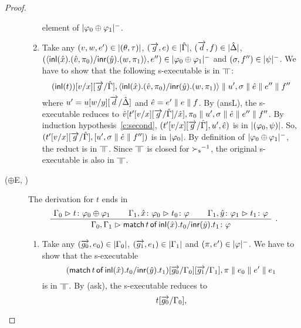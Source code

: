 \begin{proof}
\begin{description}
\begin{enumerate}[label=\textit{(\arabic{*})}]
              element of $|{\varphi_0\oplus\varphi_1}|^-$.
        \item Take any $(v,w,e')\in|{(\theta,\tau)}|$,
              $(\overrightarrow g, e)\in|{\hat{\Gamma}}|$,
              $(\overrightarrow d, f)\in|{\hat{\Delta}}|$,
              $(\langle \mathsf{inl}({\hat x}). ({\hat v},{\pi_0})/ \mathsf{inr}({\hat y}). ({w},{\pi_1})\rangle, e'')\in
              |{\varphi_0\oplus\varphi_1}|^-$ and
              $(\sigma,f'')\in|{\psi}|^-$.
              We have to show that the following s-executable is in
              $\bbot$:
              \[
               (\mathsf{inl}({t}))[v/x][\overrightarrow g/\hat{\Gamma}], \langle \mathsf{inl}({\hat x}). ({\hat v},{\pi_0})/ \mathsf{inr}({\hat
              y}). ({w},{\pi_1})\rangle\parallel
              u',\sigma\parallel
              \hat e\parallel e''\parallel f''
              \]
              where
              $u' = u[w/y][\overrightarrow d/\hat{\Delta}]$ and $\hat e=e'\parallel  e\parallel
              f$.
              By (ansL), the s-executable reduces to
              $\hat v[t'[v/x][\overrightarrow g/\hat{\Gamma}]/\hat x],\pi_0 \parallel
              u',\sigma\parallel
              \hat e\parallel e''\parallel f''
              $.
              By induction hypothesis~\ref{c:second},
              $(t'[v/x][\overrightarrow g/\hat {\Gamma}], u', \hat e)$ is in
              $|{(\varphi_0,\psi)}|$.
              So, $(t'[v/x][\overrightarrow g/\hat{\Gamma}], [u',\sigma\parallel \hat e\parallel
              f''])$ is in $|{\varphi_0}|$.
              By definition of $|{\varphi_0\oplus\varphi_1}|^-$,
              the reduct is in $\bbot$.
              Since $\bbot$ is closed for ${\succ_{\mathsf s}}^{-1}$,
              the original s-executable is also in $\bbot$.
       \end{enumerate}
   \item[($\oplus$E, \textminus)]
       The derivation for $t$ ends in
       \[
       \aseq{\G_0}{\tj{t}{\phi_0\oplus\phi_1}}
       \aseq{\G_1,\tj{\hat{x}}{\phi_0}}{\tj{t_0}{\phi}}
       \aseq{\G_1,\tj{\hat{y}}{\phi_1}}{\tj{t_1}{\phi}}
       \tseq{\G_0,\G_1}{\tj{\mat{t}{\hat x}{t_0}{\hat y}{t_1}}{\phi}}
       \DisplayProof\enspace.
       \]
       \begin{enumerate}[label=\textit{(\arabic{*})}]
        \item Take any $(\overrightarrow{g_0},{e_0})\in|{\Gamma_0}|$,\quad
              $(\overrightarrow{g_1},{e_1})\in|{\Gamma_1}|$
              and
              $(\pi,e')\in|{\varphi}|^-$.
              We have to show that the s-executable
              \[
              (\mathsf{match}\,{t}\,\mathsf{of}\, \mathsf{inl}({\hat{x}}). {t_0}/ \mathsf{inr}({\hat{y}}). {t_1})[\overrightarrow{ g_0}/\Gamma_0][\overrightarrow{g_1}/\Gamma_1],
              \pi\parallel {e_0}\parallel e'\parallel {e_1}
              \]
              is in $\bbot$.
              By (ask), the s-executable reduces to
              \[
               t[\overrightarrow{g_0}/\Gamma_0],
\]
\end{enumerate}
\end{description}
\end{proof}
